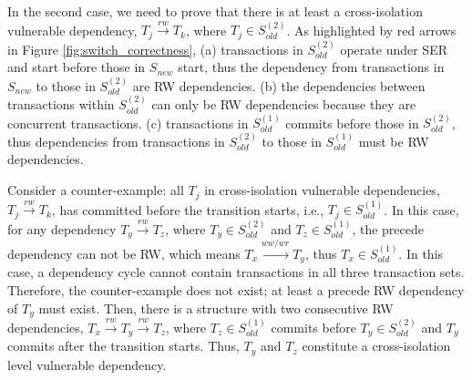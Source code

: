 In the second case, we need to prove that there is at least a cross-isolation vulnerable dependency, $T_j\xrightarrow{rw} T_k$, where $T_j\in S_{old}^{(2)}$. As highlighted by red arrows in Figure \ref{fig:switch_correctness}, (a) transactions in $S_{old}^{(2)}$ operate under SER and start before those in $S_{new}$ start, thus the dependency from transactions in $S_{new}$ to those in $S_{old}^{(2)}$ are RW dependencies.
(b) the dependencies between transactions within $S_{old}^{(2)}$ can only be RW dependencies because they are concurrent transactions. 
(c) transactions in $S_{old}^{(1)}$ commits before those in $S_{old}^{(2)}$, thus dependencies from transactions in $S_{old}^{(2)}$ to those in $S_{old}^{(1)}$ must be RW dependencies. 

Consider a counter-example: all $T_j$ in cross-isolation vulnerable dependencies, $T_j \xrightarrow{rw} T_k$, has committed before the transition starts, i.e., $T_j \in S_{old}^{(1)}$. In this case, for any dependency $T_y \xrightarrow{rw} T_z$, where $T_y\in S_{old}^{(2)}$ and $T_z\in S_{old}^{(1)}$, the precede dependency can not be RW, which means $T_x \xrightarrow{ww/wr} T_y$, thus $T_x \in S_{old}^{(1)}$. In this case, a dependency cycle cannot contain transactions in all three transaction sets. Therefore, the counter-example does not exist; at least a precede RW dependency of $T_y$ must exist. Then, there is a structure with two consecutive RW dependencies, $T_x \xrightarrow{rw} T_y \xrightarrow{rw} T_z$, where $T_z \in S_{old}^{(1)}$ commits before $T_y \in S_{old}^{(2)}$ and $T_y$ commits after the transition starts. Thus, $T_y$ and $T_z$ constitute a cross-isolation level vulnerable dependency.



